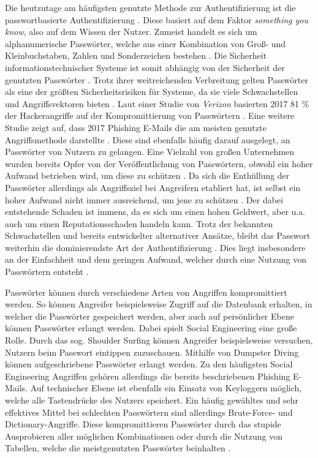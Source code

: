     Die heutzutage am häufigsten genutzte Methode zur Authentifizierung ist die passwortbasierte Authentifizierung \cite{chanda2016password} \cite{boonkrong2012security} \cite{yildirim2019encouraging}. Diese basiert auf dem Faktor \textit{something you know}, also auf dem Wissen der Nutzer. Zumeist handelt es sich um alphanumerische Passwörter, welche aus einer Kombination von Groß- und Kleinbuchstaben, Zahlen und Sonderzeichen bestehen \cite{chanda2016password}. Die Sicherheit informationstechnischer Systeme ist somit abhängig von der Sicherheit der genutzten Passwörter \cite{boonkrong2012security}. Trotz ihrer weitreichenden Verbreitung gelten Passwörter als eine der größten Sicherheitsrisiken für Systeme, da sie viele Schwachstellen und Angriffsvektoren bieten \cite{yildirim2019encouraging} \cite{farke2020you}. Laut einer Studie von \textit{Verizon} basierten 2017 81 \% der Hackerangriffe auf der Kompromittierung von Passwörtern \cite{barbosa2021provable} \cite{verizon2017}. Eine weitere Studie zeigt auf, dass 2017 Phishing E-Mails die am meisten genutzte Angriffsmethode darstellte \cite{Symantec} \cite{barbosa2021provable}. Diese sind ebenfalls häufig darauf ausgelegt, an Passwörter von Nutzern zu gelangen. Eine Vielzahl von großen Unternehmen wurden bereits Opfer von der Veröffentlichung von Passwörtern, obwohl ein hoher Aufwand betrieben wird, um diese zu schützen \cite{boonkrong2012security}. Da sich die Enthüllung der Passwörter allerdings als Angriffsziel bei Angreifern etabliert hat, ist selbst ein hoher Aufwand nicht immer ausreichend, um jene zu schützen \cite{boonkrong2012security}. Der dabei entstehende Schaden ist immens, da es sich um einen hohen Geldwert, aber u.a. auch um einen Reputationsschaden handeln kann. Trotz der bekannten Schwachstellen und bereits entwickelter alternativer Ansätze, bleibt das Passwort weiterhin die dominierendste Art der Authentifizierung \cite{ives2004domino}. Dies liegt insbesondere an der Einfachheit und dem geringen Aufwand, welcher durch eine Nutzung von Passwörtern entsteht \cite{yildirim2019encouraging}.

    Passwörter können durch verschiedene Arten von Angriffen kompromittiert werden. So können Angreifer beispielsweise Zugriff auf die Datenbank erhalten, in welcher die Passwörter gespeichert werden, aber auch auf persönlicher Ebene können Passwörter erlangt werden. Dabei spielt Social Engineering eine große Rolle. Durch das sog. Shoulder Surfing können Angreifer beispielsweise versuchen, Nutzern beim Passwort eintippen zuzuschauen. Mithilfe von Dumpster Diving können aufgeschriebene Passwörter erlangt werden. Zu den häufigsten Social Engineering Angriffen gehören allerdings die bereits beschriebenen Phishing E-Mails. Auf technischer Ebene ist ebenfalls ein Einsatz von Keyloggern möglich, welche alle Tastendrücke des Nutzers speichert. Ein häufig gewähltes und sehr effektives Mittel bei schlechten Passwörtern sind allerdings Brute-Force- und Dictionary-Angriffe. Diese kompromittieren Passwörter durch das stupide Ausprobieren aller möglichen Kombinationen oder durch die Nutzung von Tabellen, welche die meistgenutzten Passwörter beinhalten \cite{chanda2016password} \cite{morii2017research}.

